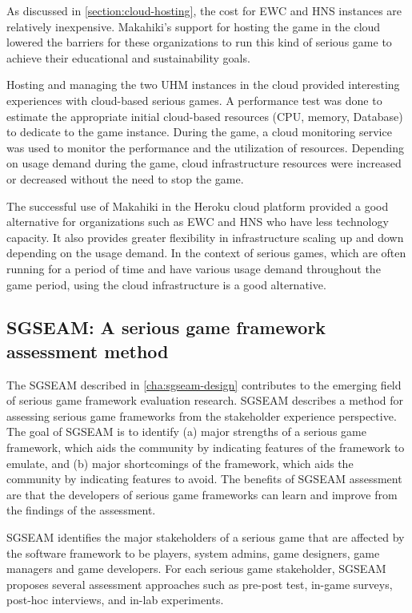 As discussed in \autoref{section:cloud-hosting}, the cost for EWC and HNS instances are relatively inexpensive. Makahiki's support for hosting the game in the cloud lowered the barriers for these organizations to run this kind of serious game to achieve their educational and sustainability goals.

Hosting and managing the two UHM instances in the cloud provided interesting experiences with cloud-based serious games. A performance test was done to estimate the appropriate initial cloud-based resources (CPU, memory, Database) to dedicate to the game instance. During the game, a cloud monitoring service was used to monitor the performance and the utilization of resources. Depending on usage demand during the game, cloud infrastructure resources were increased or decreased without the need to stop the game. 

The successful use of Makahiki in the Heroku cloud platform provided a good alternative for organizations such as EWC and HNS who have less technology capacity. It also provides greater flexibility in infrastructure scaling up and down depending on the usage demand. In the context of serious games, which are often running for a period of time and have various usage demand throughout the game period, using the cloud infrastructure is a good alternative.

\subsection{SGSEAM: A serious game framework assessment method}

The SGSEAM described in \autoref{cha:sgseam-design} contributes to the emerging field of serious game framework evaluation research. SGSEAM describes a method for assessing serious game frameworks from the stakeholder experience perspective. The goal of SGSEAM is to identify (a) major strengths of a serious game framework, which aids the community by indicating features of the framework to emulate, and
(b) major shortcomings of the framework, which aids the community by indicating features to avoid.
The benefits of SGSEAM assessment are that the developers of serious game frameworks 
can learn and improve from the findings of the assessment.

SGSEAM identifies the major stakeholders of a serious game that are affected by the software framework to be players, system admins, game designers, game managers and game developers. For each serious game stakeholder, SGSEAM proposes several assessment approaches such as pre-post test, in-game surveys, post-hoc interviews, and in-lab experiments.

